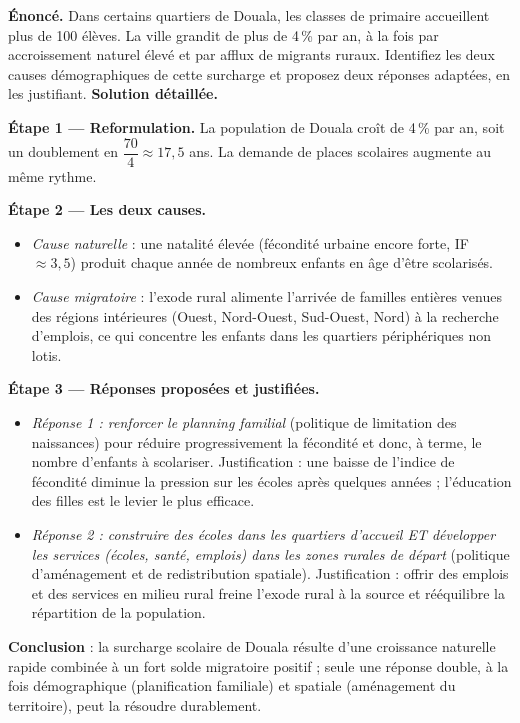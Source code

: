 \documentclass[11pt]{article}
\begin{document}
\begin{exoresolu}
\textbf{Énoncé.} Dans certains quartiers de Douala, les classes de primaire accueillent plus de 100 élèves. La ville grandit de plus de 4\,\% par an, à la fois par accroissement naturel élevé et par afflux de migrants ruraux. Identifiez les deux causes démographiques de cette surcharge et proposez deux réponses adaptées, en les justifiant.
\tcblower
\textbf{Solution détaillée.}

\textbf{Étape 1 — Reformulation.} La population de Douala croît de 4\,\% par an, soit un doublement en $\dfrac{70}{4} \approx 17,5$ ans. La demande de places scolaires augmente au même rythme.

\textbf{Étape 2 — Les deux causes.}
\begin{itemize}
\item \emph{Cause naturelle} : une natalité élevée (fécondité urbaine encore forte, IF $\approx 3,5$) produit chaque année de nombreux enfants en âge d'être scolarisés.
\item \emph{Cause migratoire} : l'exode rural alimente l'arrivée de familles entières venues des régions intérieures (Ouest, Nord-Ouest, Sud-Ouest, Nord) à la recherche d'emplois, ce qui concentre les enfants dans les quartiers périphériques non lotis.
\end{itemize}

\textbf{Étape 3 — Réponses proposées et justifiées.}
\begin{itemize}
\item \emph{Réponse 1 : renforcer le planning familial} (politique de limitation des naissances) pour réduire progressivement la fécondité et donc, à terme, le nombre d'enfants à scolariser. Justification : une baisse de l'indice de fécondité diminue la pression sur les écoles après quelques années ; l'éducation des filles est le levier le plus efficace.
\item \emph{Réponse 2 : construire des écoles dans les quartiers d'accueil ET développer les services (écoles, santé, emplois) dans les zones rurales de départ} (politique d'aménagement et de redistribution spatiale). Justification : offrir des emplois et des services en milieu rural freine l'exode rural à la source et rééquilibre la répartition de la population.
\end{itemize}
\textbf{Conclusion} : la surcharge scolaire de Douala résulte d'une croissance naturelle rapide combinée à un fort solde migratoire positif ; seule une réponse double, à la fois démographique (planification familiale) et spatiale (aménagement du territoire), peut la résoudre durablement.
\end{exoresolu}
\end{document}
